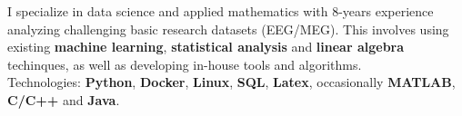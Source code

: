 \begin{cventries}
    \begin{flushleft}
        I specialize in data science and applied mathematics with 8-years
        experience analyzing challenging basic research datasets (EEG/MEG). This
        involves using existing \textbf{machine learning},
        \textbf{statistical analysis} and \textbf{linear algebra} techinques,
        as well as developing in-house tools and algorithms.\\
        Technologies: \textbf{Python}, \textbf{Docker}, \textbf{Linux}, \textbf{SQL},
        \textbf{Latex}, occasionally \textbf{MATLAB}, \textbf{C/C++} and
        \textbf{Java}.
    \end{flushleft}
\end{cventries}
